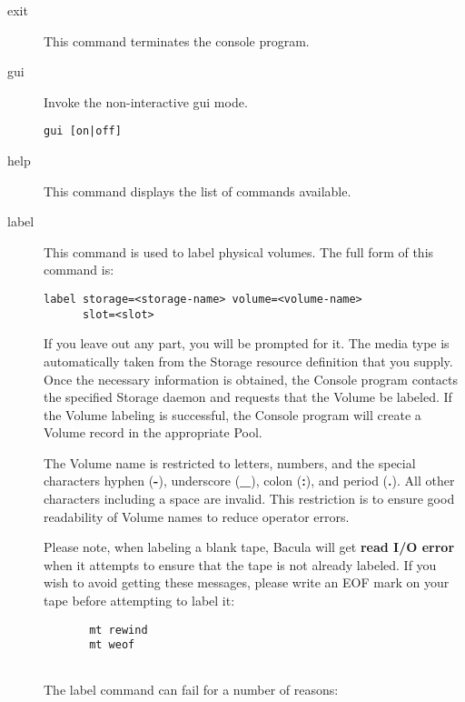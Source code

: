 \begin{description}
\item [exit]
   This command terminates the console program.  

\item [gui]
   Invoke the non-interactive gui mode.
\begin{verbatim}
gui [on|off]
\end{verbatim}

\item [help]
   This command displays the list of commands available.  

\item [label]
   This command is used to label physical volumes.  The full form of this command
   is:

\begin{verbatim}
label storage=<storage-name> volume=<volume-name>
      slot=<slot>  
\end{verbatim}

   If you leave out any part, you will be prompted for it.  The media type
   is automatically taken from the Storage resource definition that you
   supply.  Once the necessary information is obtained, the Console program
   contacts the specified Storage daemon and requests that the Volume be
   labeled.  If the Volume labeling is successful, the Console program will
   create a Volume record in the appropriate Pool.

   The Volume name is restricted to letters, numbers, and the special
   characters hyphen ({\bf -}), underscore ({\bf \_}), colon ({\bf :}), and
   period ({\bf .}).  All other characters including a space are invalid.
   This restriction is to ensure good readability of Volume names to reduce
   operator errors.

   Please note, when labeling a blank tape, Bacula will get {\bf read I/O
   error} when it attempts to ensure that the tape is not already labeled.  If
   you wish to avoid getting these messages, please write an EOF mark on
   your tape before attempting to label it:

\footnotesize
\begin{verbatim}
       mt rewind
       mt weof
       
\end{verbatim}
\normalsize

The label command can fail for a number of reasons:  


\end{description}
